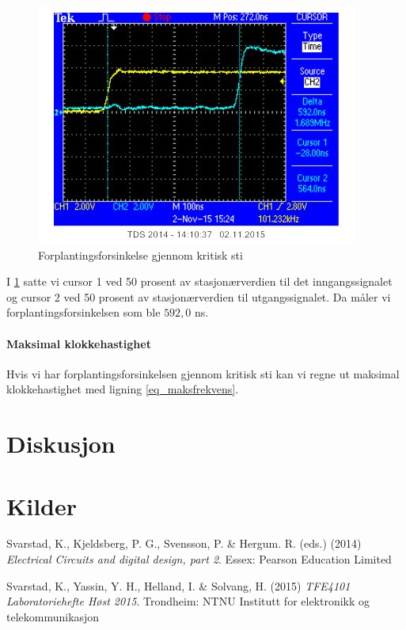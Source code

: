 \documentclass[11pt, a4paper, norwegian]{article}
\begin{document}
\begin{figure}
  \caption{Forplantingsforsinkelse gjennom kritisk sti}
  \label{plot_kritisk}
  \centerline{\includegraphics[width=\textwidth]{osc_kritisk.jpg}}
\end{figure}

I \ref{plot_kritisk} satte vi cursor 1 ved 50 prosent av stasjonærverdien til det inngangssignalet og cursor 2 ved 50 prosent av stasjonærverdien til utgangssignalet. Da måler vi forplantingsforsinkelsen som ble $592,0$ ns.  

\paragraph{Maksimal klokkehastighet}
Hvis vi har forplantingsforsinkelsen gjennom kritisk sti kan vi regne ut maksimal klokkehastighet med ligning \ref{eq_maksfrekvens}. 




\section{Diskusjon}
\section{Kilder}

\begin{thebibliography}{}


     Svarstad, K., Kjeldsberg, P. G., Svensson, P. \& Hergum. R. (eds.)  (2014) {\em Electrical Circuits and digital design, part 2}. 
    Essex: Pearson Education Limited

     Svarstad, K., Yassin, Y. H., Helland, I. \& Solvang, H. (2015) {\em TFE4101 Laboratoriehefte Høst 2015}. Trondheim: NTNU Institutt for elektronikk og telekommunikasjon
\end{thebibliography}
\end{document}
